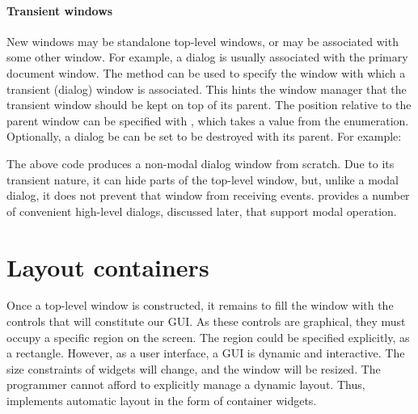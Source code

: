 \paragraph{Transient windows}
New windows may be standalone top-level windows, or may be associated
with some other window. For example, a dialog is usually associated
with the primary document window. The
 method can be used to specify the
window with which a transient (dialog) window is associated. This
hints the window manager that the transient window should be kept on
top of its parent. The position relative to the parent window can be
specified with , which takes a value from the
 enumeration. Optionally, a dialog be can be
set to be destroyed with its parent. For example:
\begin{Schunk}
\end{Schunk}
% 
The above code produces a non-modal dialog window from scratch. Due to
its transient nature, it can hide parts of the top-level window, but,
unlike a modal dialog, it does not prevent that window from receiving
events. \GTK\/ provides a number of convenient high-level dialogs,
discussed later, that support modal operation.



\section{Layout containers}
\label{sec:RGtk2:layout}

Once a top-level window is constructed, it remains to fill the window
with the controls that will constitute our GUI. As these controls are
graphical, they must occupy a specific region on the screen. The
region could be specified explicitly, as a rectangle. However, as a
user interface, a GUI is dynamic and interactive. The size constraints
of widgets will change, and the window will be resized. The programmer
cannot afford to explicitly manage a dynamic layout. Thus, \GTK\/
implements automatic layout in the form of container widgets.

